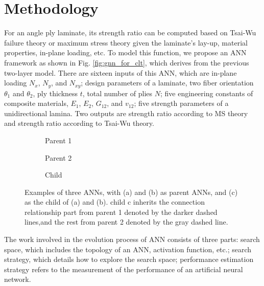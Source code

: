 \section{Methodology}
For an angle ply laminate, its strength ratio can be computed based on Tsai-Wu
failure theory or maximum stress theory given the laminate's lay-up, material properties,
in-plane loading, etc. To model this function, we propose an
ANN framework as shown in Fig. \ref{fig:gnn_for_clt}, which derives from the previous
two-layer model. There are sixteen inputs of this ANN, which are in-plane
loading $N_x$, $N_y$, and $N_{xy}$; design parameters of a laminate, two 
fiber orientation $\theta_1$ and $\theta_2$, ply thickness $t$, total
number of plies $N$; 
five engineering constants of composite materials,
$E_1$, $E_2$, $G_{12}$, and $v_{12}$; five strength parameters of a
unidirectional lamina.  Two outputs are strength ratio according to MS theory
and strength ratio according to Tsai-Wu theory.



\begin{figure}[t]
	\centering
	\begin{subfigure}[b]{1.0\linewidth}
		\centering
		
		\caption{Parent 1}
	\end{subfigure}
	\newline
	\begin{subfigure}[b]{1.0\linewidth}
		\centering
		
		\caption{Parent 2}
	\end{subfigure}
	\newline
	\begin{subfigure}[b]{1.0\linewidth}
		\centering
		
		\caption{Child}
	\end{subfigure}
	\caption{Examples of three ANNs, with (a) and (b) as parent ANNs, and (c) as
		the child of (a) and (b). child c inherits the connection relationship
		part from parent 1 denoted by the darker dashed lines,and the rest from
		parent 2 denoted by the gray dashed line.}
		\label{fig:three_anns}
\end{figure}


The work involved in the evolution process of ANN consists of three parts:
search space, which includes the topology of an ANN, activation function, etc.;
search strategy, which details how to explore the search space; performance
estimation strategy refers to the measurement of the performance of
an artificial neural network.

